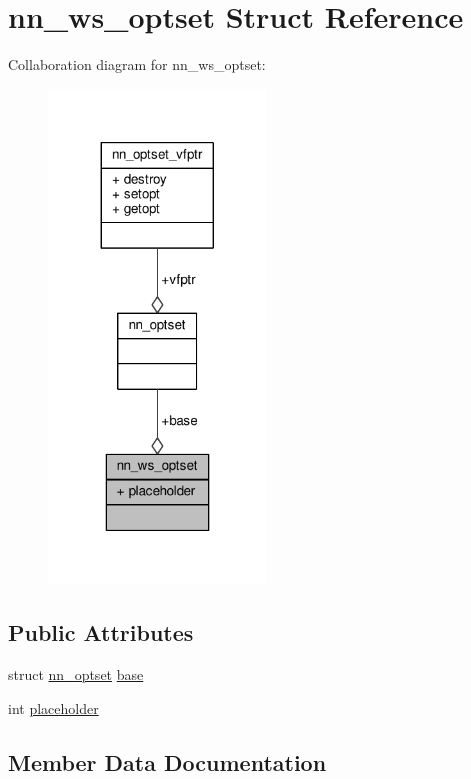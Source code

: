 \hypertarget{structnn__ws__optset}{}\section{nn\+\_\+ws\+\_\+optset Struct Reference}
\label{structnn__ws__optset}


Collaboration diagram for nn\+\_\+ws\+\_\+optset\+:\nopagebreak
\begin{figure}[H]
\begin{center}
\leavevmode
\includegraphics[width=164pt]{structnn__ws__optset__coll__graph}
\end{center}
\end{figure}
\subsection*{Public Attributes}
\begin{DoxyCompactItemize}
\item 
struct \hyperlink{structnn__optset}{nn\+\_\+optset} \hyperlink{structnn__ws__optset_a88e3f6c3846eb4142b038b3723d7a284}{base}
\item 
int \hyperlink{structnn__ws__optset_ad487ef22a8d90519c7b858707bfb997a}{placeholder}
\end{DoxyCompactItemize}


\subsection{Member Data Documentation}
